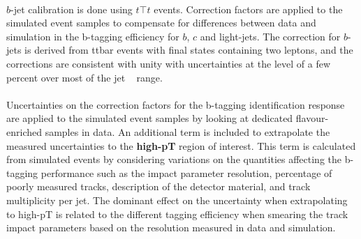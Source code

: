 

\paragraph{}
$b$-jet calibration is done using $t\top{t}$ events.
Correction factors are applied to the simulated event samples to compensate for differences between data and simulation in the b-tagging efficiency for $b$, $c$ and light-jets. The correction for $b$-jets is derived from ttbar events with final states containing two leptons, and the corrections are consistent with unity with uncertainties at the level of a few percent over most of the jet \pt~ range.

\paragraph{}
Uncertainties on the correction factors for the b-tagging identification response are applied to the simulated event samples by looking at dedicated flavour-enriched samples in data. An additional term is included to extrapolate the measured uncertainties to the \textbf{high-pT} region of interest. This term is calculated from simulated events by considering variations on the quantities affecting the b-tagging performance such as the impact parameter resolution, percentage of poorly measured tracks, description of the detector material, and track multiplicity per jet. The dominant effect on the uncertainty when extrapolating to high-pT is related to the different tagging efficiency when smearing the track impact parameters based on the resolution measured in data and simulation.

